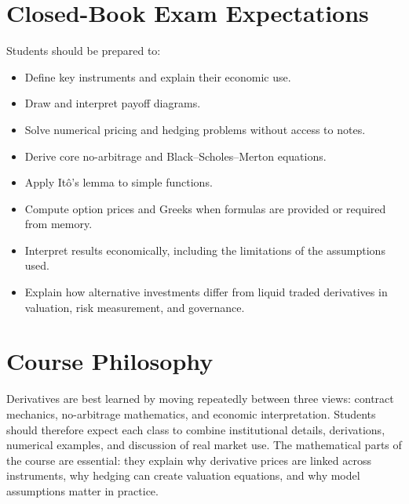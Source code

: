 \documentclass[11pt]{article}
\begin{document}
\section*{Closed-Book Exam Expectations}

Students should be prepared to:
\begin{itemize}
    \item Define key instruments and explain their economic use.
    \item Draw and interpret payoff diagrams.
    \item Solve numerical pricing and hedging problems without access to notes.
    \item Derive core no-arbitrage and Black--Scholes--Merton equations.
    \item Apply It\^o's lemma to simple functions.
    \item Compute option prices and Greeks when formulas are provided or required from memory.
    \item Interpret results economically, including the limitations of the assumptions used.
    \item Explain how alternative investments differ from liquid traded derivatives in valuation, risk measurement, and governance.
\end{itemize}

\section*{Course Philosophy}

Derivatives are best learned by moving repeatedly between three views: contract mechanics, no-arbitrage mathematics, and economic interpretation. Students should therefore expect each class to combine institutional details, derivations, numerical examples, and discussion of real market use. The mathematical parts of the course are essential: they explain why derivative prices are linked across instruments, why hedging can create valuation equations, and why model assumptions matter in practice.
\end{document}
